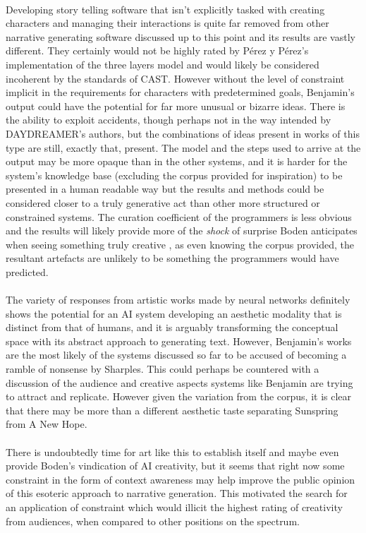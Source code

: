 \documentclass[letterpaper]{article}
\begin{document}
\\Developing story telling software that isn't explicitly tasked with creating characters and managing their interactions is quite far removed from other narrative generating software discussed up to this point and its results are vastly different. They certainly would not be highly rated by P\'erez y P\'erez's implementation of the three layers model and would likely be considered incoherent by the standards of CAST. However without the level of constraint implicit in the requirements for characters with predetermined goals, Benjamin's output could have the potential for far more unusual or bizarre ideas. There is the ability to exploit accidents, though perhaps not in the way intended by DAYDREAMER's authors, but the combinations of ideas present in works of this type are still, exactly that, present. The model and the steps used to arrive at the output may be more opaque than in the other systems, and it is harder for the system's knowledge base (excluding the corpus provided for inspiration) to be presented in a human readable way but the results and methods could be considered closer to a truly generative act than other more structured or constrained systems. The curation coefficient of the programmers is less obvious and the results will likely provide more of the \emph{shock} of surprise Boden anticipates when seeing something truly creative \cite{BODEN1998347}, as even knowing the corpus provided, the resultant artefacts are unlikely to be something the programmers would have predicted.\\
\\The variety of responses from artistic works made by neural networks definitely shows the potential for an AI system developing an aesthetic modality that is distinct from that of humans, and it is arguably transforming the conceptual space with its abstract approach to generating text. However, Benjamin's works are the most likely of the systems discussed so far to be accused of becoming a ramble of nonsense by Sharples. This could perhaps be countered with a discussion of the audience and creative aspects systems like Benjamin are trying to attract and replicate. However given the variation from the corpus, it is clear that there may be more than a different aesthetic taste separating Sunspring from A New Hope.\\
\\There is undoubtedly time for art like this to establish itself and maybe even provide Boden's vindication of AI creativity, but it seems that right now some constraint in the form of context awareness may help improve the public opinion of this esoteric approach to narrative generation. This motivated the search for an application of constraint which would illicit the highest rating of creativity from audiences, when compared to other positions on the spectrum.
\end{document}
